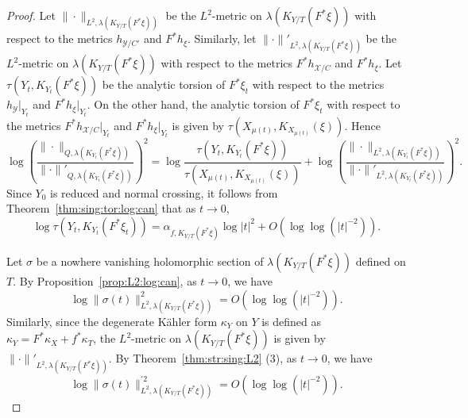 \documentclass[amscd, leqno]{amsart}
\theoremstyle{plain}
\theoremstyle{definition}
\theoremstyle{remark}
\newenvironment{pf}{\begin{proof}}{\end{proof}}
\begin{document}
\begin{pf}
Let $\|\cdot\|_{L^{2},\lambda(K_{Y/T}(F^{*}\xi) )}$ be the $L^{2}$-metric on $\lambda(K_{Y/T}(F^{*}\xi))$ with respect to the metrics 
$h_{{\mathcal Y}/C'}$ and $F^{*}h_{\xi}$. Similarly, let $\|\cdot\|'_{L^{2},\lambda(K_{Y/T}(F^{*}\xi))}$ be the $L^{2}$-metric on 
$\lambda(K_{Y/T}(F^{*}\xi))$ with respect to the metrics $F^{*}h_{{\mathcal X}/C}$ and $F^{*}h_{\xi}$.
Let $\tau(Y_{t}, K_{Y_{t}}(F^{*}\xi))$ be the analytic torsion of $F^{*}\xi_{t}$ with respect to the metrics $h_{\mathcal Y}|_{Y_{t}}$ and 
$F^{*}h_{\xi}|_{Y_{t}}$.
On the other hand, the analytic torsion of $F^{*}\xi_{t}$ with respect to the metrics $F^{*}h_{{\mathcal X}/C}|_{Y_{t}}$ and 
$F^{*}h_{\xi}|_{Y_{t}}$ is given by $\tau(X_{\mu(t)}, K_{X_{\mu(t)}}(\xi))$. Hence 
\begin{equation}
\label{eqn:comparison:Quillen:1}
\log\left(\frac{\|\cdot\|_{Q,\lambda(K_{Y_{t}}(F^{*}\xi))}}{\|\cdot\|'_{Q,\lambda(K_{Y_{t}}(F^{*}\xi))}}\right)^{2}
=
\log\frac{\tau(Y_{t}, K_{Y_{t}}(F^{*}\xi))}{\tau(X_{\mu(t)}, K_{X_{\mu(t)}}(\xi))}
+
\log\left(\frac{\|\cdot\|_{L^{2},\lambda(K_{Y_{t}}(F^{*}\xi))}}{\|\cdot\|'_{L^{2},\lambda(K_{Y_{t}}(F^{*}\xi))}}\right)^{2}.
\end{equation}
Since $Y_{0}$ is reduced and normal crossing, it follows from Theorem~\ref{thm:sing:tor:log:can} that as $t \to 0$,
\begin{equation}
\label{eqn:asymptotics:torsion:1}
\log\tau(Y_{t}, K_{Y_{t}}(F^{*}\xi_{t})) = \alpha_{f, K_{Y/T}(F^{*}\xi)} \log|t|^{2} + O\left( \log\log (| t |^{-2}) \right).
\end{equation}
\par
Let $\sigma$ be a nowhere vanishing holomorphic section of $\lambda(K_{Y/T}(F^{*}\xi))$ defined on $T$. 
By Proposition~\ref{prop:L2:log:can}, as $t\to0$, we have
\begin{equation}
\label{eqn:estimate:L2:metric:1}
\log\|\sigma(t)\|_{L^{2},\lambda(K_{Y/T}(F^{*}\xi))}^{2} = O\left( \log\log(| t |^{-2}) \right).
\end{equation}
Similarly, since the degenerate K\"ahler form $\kappa_{Y}$ on $Y$ is defined as $\kappa_{Y} = F^{*}\kappa_{X} + f^{*}\kappa_{T}$, 
the $L^{2}$-metric on $\lambda(K_{Y/T}(F^{*}\xi))$ is given by $\| \cdot \|'_{L^{2},\lambda(K_{Y/T}(F^{*}\xi))}$.
By Theorem~\ref{thm:str:sing:L2} (3), as $t \to 0$, we have
\begin{equation}
\label{eqn:estimate:L2:metric:2}
\log\|\sigma(t)\|^{\prime 2}_{L^{2},\lambda(K_{Y/T}(F^{*}\xi))} = O\left( \log\log(| t |^{-2}) \right).

\end{equation}
\end{pf}
\end{document}
